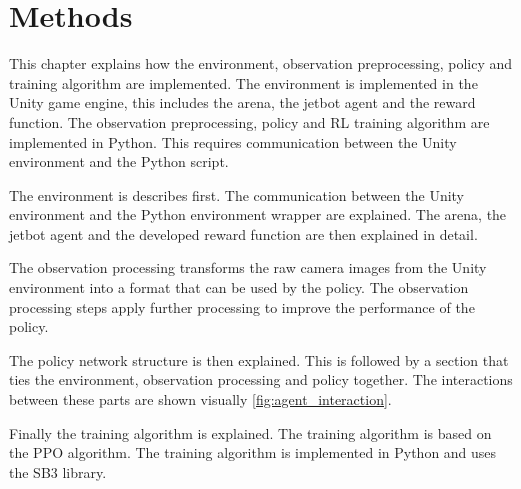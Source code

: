 \chapter{Methods}
\label{cha:Methods}

This chapter explains how the environment, observation preprocessing, policy and training algorithm are implemented. The environment is implemented in the Unity game engine, this includes the arena, the jetbot agent and the reward function. The observation preprocessing, policy and \ac{RL} training algorithm are implemented in Python. This requires communication between the Unity environment and the Python script.

The environment is describes first. The communication between the Unity environment and the Python environment wrapper are explained. The arena, the jetbot agent and the developed reward function are then explained in detail.

The observation processing transforms the raw camera images from the Unity environment into a format that can be used by the policy. The observation processing steps apply further processing to improve the performance of the policy.

The policy network structure is then explained. This is followed by a section that ties the environment, observation processing and policy together. The  interactions between these parts are shown visually \ref{fig:agent_interaction}.

Finally the training algorithm is explained. The training algorithm is based on the \ac{PPO} algorithm. The training algorithm is implemented in Python and uses the \ac{SB3} library.






